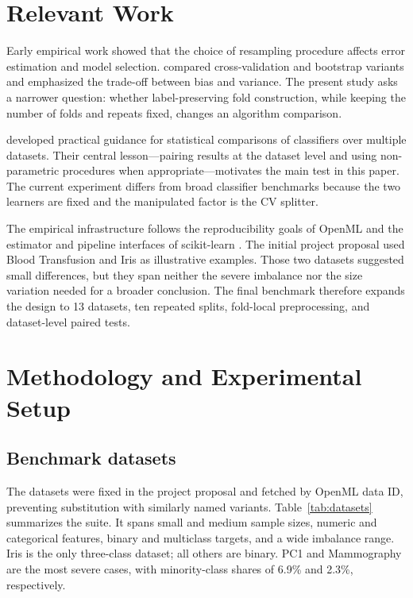 \documentclass[twoside,11pt]{article}
\begin{document}
\section{Relevant Work}
Early empirical work showed that the choice of resampling procedure affects error estimation and model selection. \citet{kohavi1995} compared cross-validation and bootstrap variants and emphasized the trade-off between bias and variance. The present study asks a narrower question: whether label-preserving fold construction, while keeping the number of folds and repeats fixed, changes an algorithm comparison.

\citet{demsar2006} developed practical guidance for statistical comparisons of classifiers over multiple datasets. Their central lesson---pairing results at the dataset level and using non-parametric procedures when appropriate---motivates the main test in this paper. The current experiment differs from broad classifier benchmarks because the two learners are fixed and the manipulated factor is the CV splitter.

The empirical infrastructure follows the reproducibility goals of OpenML \citep{vanschoren2014} and the estimator and pipeline interfaces of scikit-learn \citep{pedregosa2011}. The initial project proposal used Blood Transfusion and Iris as illustrative examples. Those two datasets suggested small differences, but they span neither the severe imbalance nor the size variation needed for a broader conclusion. The final benchmark therefore expands the design to 13 datasets, ten repeated splits, fold-local preprocessing, and dataset-level paired tests.

\section{Methodology and Experimental Setup}
\subsection{Benchmark datasets}
The datasets were fixed in the project proposal and fetched by OpenML data ID, preventing substitution with similarly named variants. Table~\ref{tab:datasets} summarizes the suite. It spans small and medium sample sizes, numeric and categorical features, binary and multiclass targets, and a wide imbalance range. Iris is the only three-class dataset; all others are binary. PC1 and Mammography are the most severe cases, with minority-class shares of 6.9\% and 2.3\%, respectively.
\end{document}
